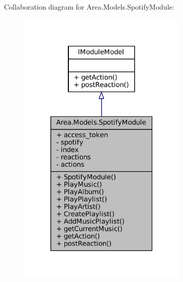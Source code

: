 Collaboration diagram for Area.\+Models.\+Spotify\+Module\+:
\nopagebreak
\begin{figure}[H]
\begin{center}
\leavevmode
\includegraphics[width=231pt]{classArea_1_1Models_1_1SpotifyModule__coll__graph}
\end{center}
\end{figure}
